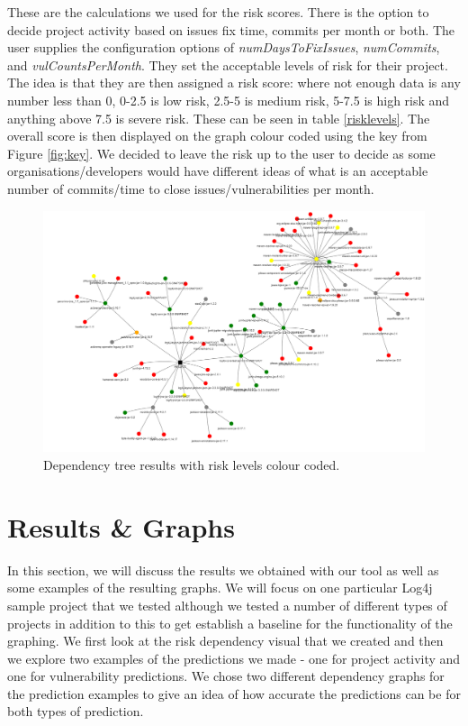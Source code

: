 \documentclass[conference]{IEEEtran}
\begin{document}
These are the calculations we used for the risk scores. There is the option to decide project activity based on issues fix time, commits per month or both. The user supplies the configuration options of \textit{numDaysToFixIssues}, \textit{numCommits}, and \textit{vulCountsPerMonth}. They set the acceptable levels of risk for their project. The idea is that they are then assigned a risk score: where not enough data is any number less than 0, 0-2.5 is low risk, 2.5-5 is medium risk, 5-7.5 is high risk and anything above 7.5 is severe risk. These can be seen in table \ref{risklevels}. The overall score is then displayed on the graph colour coded using the key from Figure \ref{fig:key}. We decided to leave the risk up to the user to decide as some organisations/developers would have different ideas of what is an acceptable number of commits/time to close issues/vulnerabilities per month. 

\begin{figure}
    \centering
    \includegraphics[scale=0.5]{dependency.png}
    \caption{Dependency tree results with risk levels colour coded.} 
    \label{fig:tree}
\end{figure}
\section{Results \& Graphs}

In this section, we will discuss the results we obtained with our tool as well as some examples of the resulting graphs. We will focus on one particular Log4j sample project \cite{noauthor_logging-log4j-sampleslog4j-server_nodate} that we tested although we tested a number of different types of projects in addition to this to get establish a baseline for the functionality of the graphing. We first look at the risk dependency visual that we created and then we explore two examples of the predictions we made - one for project activity and one for vulnerability predictions. We chose two different dependency graphs for the prediction examples to give an idea of how accurate the predictions can be for both types of prediction. 
\end{document}
